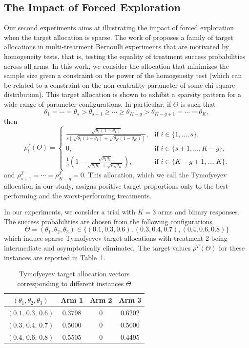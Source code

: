 \subsection{The Impact of Forced Exploration} Our second experiments aims at illustrating the impact of forced exploration when the target allocation is sparse.
The work of \cite{tymofyeyev2007implementing} proposes a family of target allocations in multi-treatment Bernoulli experiments that are motivated by homogeneity tests, that is, testing
the equality of treatment success probabilities across all arms. In this work, we consider the allocation that minimizes the sample size given a constraint on the power of the homogeneity test (which can be related to a constraint on the non-centrality parameter of some chi-square distribution). This target allocation is shown to exhibit a sparsity pattern for a wide range of parameter configurations. In particular, if $\Theta$ is such that
\[\theta_1=\cdots=\theta_s
>
\theta_{s+1}\geq\cdots\geq \theta_{K-g}
>
\theta_{K-g+1}=\cdots=\theta_K ,\]
then
\[
\rho_i^T(\Theta)=
\begin{cases}
	\displaystyle
	\frac{\sqrt{\theta_1 (1 - \theta_1)}}
	{s\left(\sqrt{\theta_1 (1 - \theta_1)}+\sqrt{\theta_K (1 - \theta_K)}\right)},
	& \text{if } i\in\{1,\dots,s\},
	\\[1.2em]
	0,
	& \text{if } i\in\{s+1,\dots,K-g\},
	\\[1.2em]
	\displaystyle
	\frac{1}{g}\left(
	1-
	\frac{\sqrt{p_1q_1}}
	{\sqrt{p_1q_1}+\sqrt{p_Kq_K}}
	\right),
	& \text{if } i\in\{K-g+1,\dots,K\}.
\end{cases}
\]
and \(\rho_{s+1}^T=\cdots=\rho_{K-g}^T=0\). This allocation, which we call the Tymofyeyev allocation in our study, assigns positive target proportions only to the best-performing and the worst-performing treatments. 


In our experiments, we consider a trial with $K=3$ arms and binary responses. The success probabilities are chosen from the following configurations
\[\Theta=(\theta_1,\theta_2,\theta_3) \in \{(0.1,0.3,0.6), (0.3,0.4,0.7), (0.4,0.6,0.8)\}\]
which induce sparse Tymofyeyev target allocations with treatment 2 being intermediate and asymptotically eliminated. The target values \(\rho^{T}\left(\Theta\right)\) for these instances are reported  in Table~\ref{tab:rho_tymo}.

\begin{table}[b]
	\centering
	\begin{tabular}{c|ccc}
		\hline
		$(\theta_1,\theta_2,\theta_3)$ & Arm 1 & Arm 2 & Arm 3 \\
		\hline
		$(0.1,\,0.3,\,0.6)$ & 0.3798 & 0 & 0.6202 \\
		$(0.3,\,0.4,\,0.7)$ & 0.5000 & 0 & 0.5000 \\
		$(0.4,\,0.6,\,0.8)$ & 0.5505 & 0 & 0.4495 \\
		\hline
	\end{tabular}
	\caption{\label{tab:rho_tymo}Tymofyeyev target allocation vectors corresponding to different instances $\Theta$}
\end{table}

